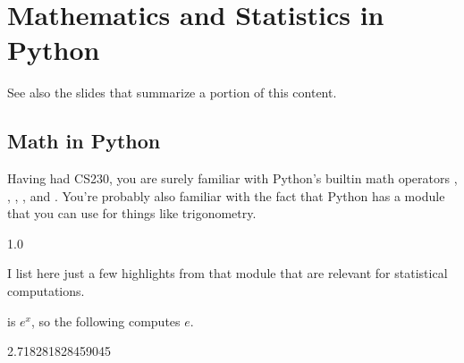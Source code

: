 \documentclass[letterpaper,10pt,english]{jupyterBook}
\begin{document}
\chapter{Mathematics and Statistics in Python}
\label{\detokenize{chapter-9-math-and-stats:mathematics-and-statistics-in-python}}\label{\detokenize{chapter-9-math-and-stats::doc}}
\sphinxAtStartPar
See also the slides that summarize a portion of this content.


\section{Math in Python}
\label{\detokenize{chapter-9-math-and-stats:math-in-python}}
\sphinxAtStartPar
Having had CS230, you are surely familiar with Python’s built\sphinxhyphen{}in math operators \sphinxcode{\sphinxupquote{+}}, \sphinxcode{\sphinxupquote{\sphinxhyphen{}}}, \sphinxcode{\sphinxupquote{*}}, \sphinxcode{\sphinxupquote{/}}, and \sphinxcode{\sphinxupquote{**}}.  You’re probably also familiar with the fact that Python has a  module that you can use for things like trigonometry.

\begin{sphinxVerbatim}[commandchars=\\\{\}]
 
  
\end{sphinxVerbatim}

\begin{sphinxVerbatim}[commandchars=\\\{\}]
1.0
\end{sphinxVerbatim}

\sphinxAtStartPar
I list here just a few highlights from that module that are relevant for statistical computations.

\sphinxAtStartPar
{} is \(e^x\), so the following computes \(e\).

\begin{sphinxVerbatim}[commandchars=\\\{\}]
  
\end{sphinxVerbatim}

\begin{sphinxVerbatim}[commandchars=\\\{\}]
2.718281828459045
\end{sphinxVerbatim}
\end{document}
